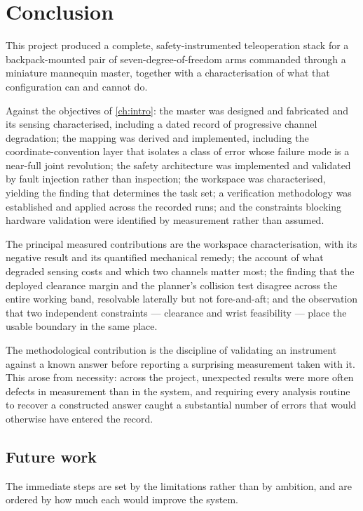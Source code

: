 \chapter{Conclusion}
\label{ch:conclusion}

This project produced a complete, safety-instrumented teleoperation stack for
a backpack-mounted pair of seven-degree-of-freedom arms commanded through a
miniature mannequin master, together with a characterisation of what that
configuration can and cannot do.

Against the objectives of \cref{ch:intro}: the master was designed and
fabricated and its sensing characterised, including a dated record of
progressive channel degradation; the mapping was derived and implemented,
including the coordinate-convention layer that isolates a class of error whose
failure mode is a near-full joint revolution; the safety architecture was
implemented and validated by fault injection rather than inspection; the
workspace was characterised, yielding the finding that determines the task
set; a verification methodology was established and applied across the
recorded runs; and the constraints blocking hardware validation were
identified by measurement rather than assumed.

The principal measured contributions are the workspace characterisation, with
its negative result and its quantified mechanical remedy; the account of what
degraded sensing costs and which two channels matter most; the finding that
the deployed clearance margin and the planner's collision test disagree across
the entire working band, resolvable laterally but not fore-and-aft; and the
observation that two independent constraints --- clearance and wrist
feasibility --- place the usable boundary in the same place.

The methodological contribution is the discipline of validating an instrument
against a known answer before reporting a surprising measurement taken with
it. This arose from necessity: across the project, unexpected results were
more often defects in measurement than in the system, and requiring every
analysis routine to recover a constructed answer caught a substantial number
of errors that would otherwise have entered the record.

\section{Future work}

The immediate steps are set by the limitations rather than by ambition, and
are ordered by how much each would improve the system.

